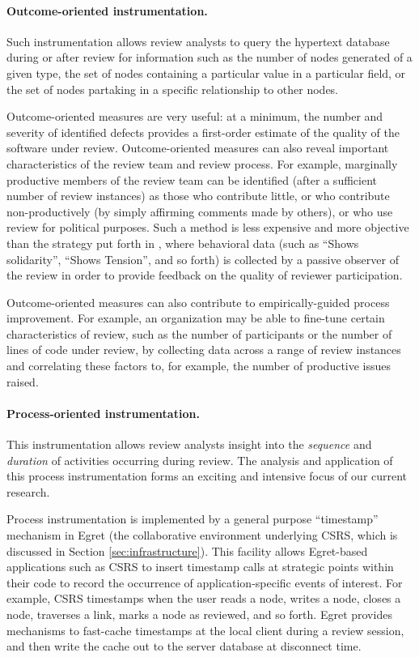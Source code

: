 \paragraph{Outcome-oriented instrumentation.} Such instrumentation allows review analysts
to query the hypertext database during or after review for information such
as the number of nodes generated of a given type, the set of nodes
containing a particular value in a particular field, or the set of nodes
partaking in a specific relationship to other nodes.

Outcome-oriented measures are very useful: at a minimum, the number and
severity of identified defects provides a first-order estimate of the
quality of the software under review.  Outcome-oriented measures can also
reveal important characteristics of the review team and review process.
For example, marginally productive members of the review team can be
identified (after a sufficient number of review instances) as those who
contribute little, or who contribute non-productively (by simply affirming
comments made by others), or who use review for political purposes.  Such a
method is less expensive and more objective than the strategy put forth in
\cite{Freedman90}, where behavioral data (such as ``Shows solidarity'',
``Shows Tension'', and so forth) is collected by a passive observer of the
review in order to provide feedback on the quality of reviewer
participation.

Outcome-oriented measures can also contribute to empirically-guided process
improvement.  For example, an organization may be able to fine-tune certain
characteristics of review, such as the number of participants or the number
of lines of code under review, by collecting data across a range of review
instances and correlating these factors to, for example, the number of
productive issues raised.

\paragraph{Process-oriented instrumentation.} This instrumentation allows review
analysts insight into the {\em sequence}\/ and {\em duration}\/ of
activities occurring during review.  The analysis and application of this
process instrumentation forms an exciting and intensive focus of our
current research.

Process instrumentation is implemented by a general purpose ``timestamp''
mechanism in Egret (the collaborative environment underlying CSRS, which is
discussed in Section \ref{sec:infrastructure}).  This facility allows
Egret-based applications such as CSRS to insert timestamp calls at
strategic points within their code to record the occurrence of
application-specific events of interest. For example, CSRS timestamps when
the user reads a node, writes a node, closes a node, traverses a link,
marks a node as reviewed, and so forth.  Egret provides mechanisms to
fast-cache timestamps at the local client during a review session, and then
write the cache out to the server database at disconnect time.


